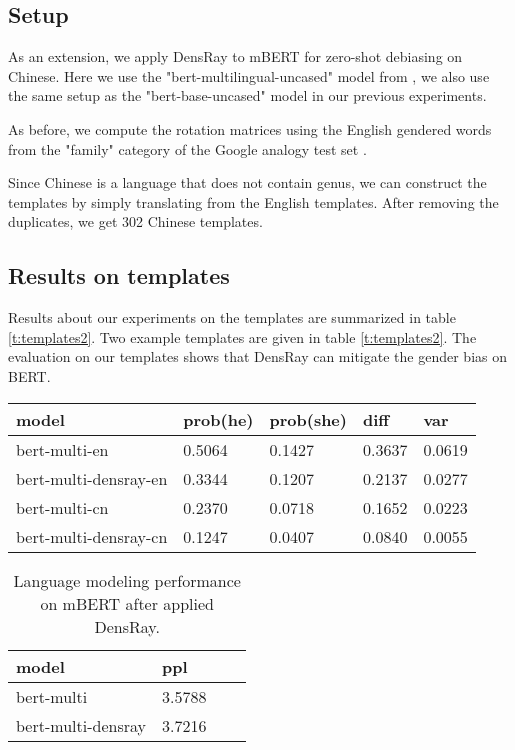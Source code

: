 \subsection{Setup}
As an extension, we apply DensRay to mBERT for zero-shot debiasing on Chinese. Here we use the "bert-multilingual-uncased" model from \citep{wolf2019huggingfaces}, we also use the same setup as the "bert-base-uncased" model in our previous experiments.  

As before, we compute the rotation matrices using the English gendered words from the "family" category of the Google analogy test set \citep{mikolov2013efficient}.

Since Chinese is a language that does not contain genus, we can construct the templates by simply translating from the English templates. After removing the duplicates, we get 302 Chinese templates. 

\subsection{Results on templates}
Results about our experiments on the templates are summarized in table \ref{t:templates2}. Two example templates are given in table \ref{t:templates2}. The evaluation on our templates shows that DensRay can mitigate the gender bias on BERT.
\begin{table*}[ht]
\centering
\begin{tabular}{lllll}
\hline
model & prob(he) & prob(she) & diff & var\\
\hline
bert-multi-en & 0.5064 & 0.1427 & 0.3637 & 0.0619 \\
bert-multi-densray-en & 0.3344 & 0.1207 & 0.2137 & 0.0277 \\
bert-multi-cn & 0.2370 & 0.0718 & 0.1652 & 0.0223 \\
bert-multi-densray-cn & 0.1247 & 0.0407 & 0.0840 & 0.0055\\
\hline
\end{tabular}
\caption{\label{t:templates2}
Results of templates on mBERT after applied DensRay. Models with \textit{-en} are tested on our English templates, and those with \textit{-cn} are tested on our Chinese templates.}
\end{table*}

\begin{table}[ht]
\centering
\begin{tabular}{llll}
\hline
model & ppl\\
\hline
bert-multi & 3.5788\\
bert-multi-densray & 3.7216\\
\hline
\end{tabular}
\caption{\label{t:ppl2}
Language modeling performance on mBERT after applied DensRay.}
\end{table}

